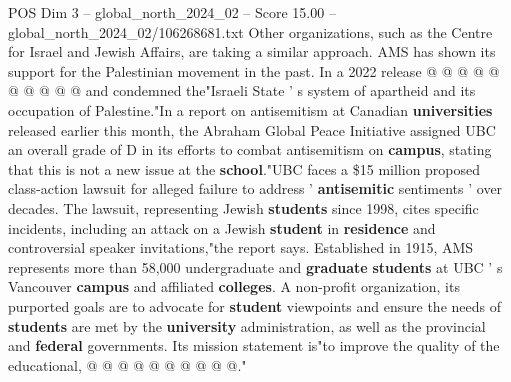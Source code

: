 \begin{textsample}{POS Dim 3 – global\_north\_2024\_02 – Score 15.00 – global\_north\_2024\_02/106268681.txt}
Other organizations, such as the Centre for Israel and Jewish Affairs, are taking a similar approach.
AMS has shown its support for the Palestinian movement in the past.
In a 2022 release @ @ @ @ @ @ @ @ @ @ and condemned the"Israeli State ' s system of apartheid and its occupation of Palestine."In a report on antisemitism at Canadian \textbf{universities} released earlier this month, the Abraham Global Peace Initiative assigned UBC an overall grade of D in its efforts to combat antisemitism on \textbf{campus}, stating that this is not a new issue at the \textbf{school}."UBC faces a \$15 million proposed class-action lawsuit for alleged failure to address ' \textbf{antisemitic} sentiments ' over decades.
The lawsuit, representing Jewish \textbf{students} since 1998, cites specific incidents, including an attack on a Jewish \textbf{student} in \textbf{residence} and controversial speaker invitations,"the report says.
Established in 1915, AMS represents more than 58,000 undergraduate and \textbf{graduate} \textbf{students} at UBC ' s Vancouver \textbf{campus} and affiliated \textbf{colleges}.
A non-profit organization, its purported goals are to advocate for \textbf{student} viewpoints and ensure the needs of \textbf{students} are met by the \textbf{university} administration, as well as the provincial and \textbf{federal} governments.
Its mission statement is"to improve the quality of the educational, @ @ @ @ @ @ @ @ @ @."

\end{textsample}
